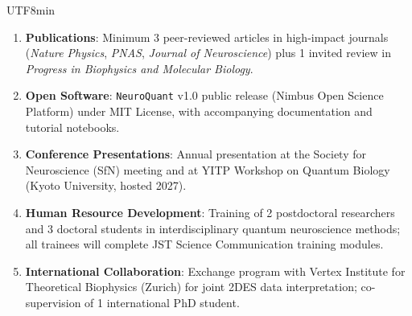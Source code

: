 \documentclass[11pt,a4paper]{article}
\newcommand{\bilabel}[2]{%
  \textbf{\textcolor{jspsNavy}{#1}}\enspace{\footnotesize\textcolor{jspsSlate}{(#2)}}%
}
\begin{document}
\begin{CJK}{UTF8}{min}
\begin{tcolorbox}[jspsSection,
  title={\faFile\enspace \bilabel{Expected Outcomes and Dissemination}{成果と普及}{} \hfill \small Section 7}]
\begin{enumerate}[leftmargin=1.6em, label=\textbf{\arabic*.}, itemsep=2pt]
  \item \textbf{Publications}: Minimum 3 peer-reviewed articles in high-impact journals (\textit{Nature Physics}, \textit{PNAS}, \textit{Journal of Neuroscience}) plus 1 invited review in \textit{Progress in Biophysics and Molecular Biology}.
  \item \textbf{Open Software}: \texttt{NeuroQuant} v1.0 public release (Nimbus Open Science Platform) under MIT License, with accompanying documentation and tutorial notebooks.
  \item \textbf{Conference Presentations}: Annual presentation at the Society for Neuroscience (SfN) meeting and at YITP Workshop on Quantum Biology (Kyoto University, hosted 2027).
  \item \textbf{Human Resource Development}: Training of 2 postdoctoral researchers and 3 doctoral students in interdisciplinary quantum neuroscience methods; all trainees will complete JST Science Communication training modules.
  \item \textbf{International Collaboration}: Exchange program with Vertex Institute for Theoretical Biophysics (Zurich) for joint 2DES data interpretation; co-supervision of 1 international PhD student.
\end{enumerate}


\end{tcolorbox}
\end{CJK}
\end{document}
